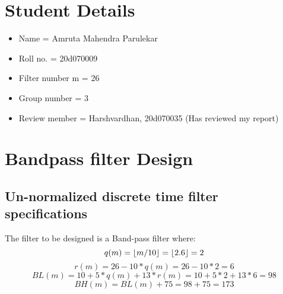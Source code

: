\documentclass[12pt]{article}
\DeclarePairedDelimiter\floor{\lfloor}{\rfloor}
\begin{document}

\newpage
\tableofcontents
\newpage
\section{Student Details} %
\begin{itemize}[nolistsep]
    \item Name = Amruta Mahendra Parulekar
    \item Roll no. = 20d070009
    \item Filter number m = 26
    \item Group number = 3
    \item Review member = Harshvardhan, 20d070035 (Has reviewed my report)
\end{itemize}
\section{Bandpass filter Design}
\subsection{Un-normalized discrete time filter specifications}

  
    The filter to be designed is a Band-pass filter where:
    \begin{equation}
        q(m) = \floor{m/10} = \floor{2.6} = 2
    \end{equation}
    \begin{equation}
        r(m) = 26 - 10*q(m) = 26 - 10*2 = 6
    \end{equation}
    \begin{equation}
        BL(m) = 10 + 5*q(m) + 13*r(m) = 10 + 5*2 + 13*6 = 98
    \end{equation}
    \begin{equation}
        BH(m) = BL(m) + 75 = 98 + 75 = 173
    \end{equation}
  
\end{document}
